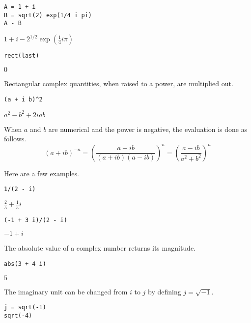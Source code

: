 \documentclass[12pt]{article}
\begin{document}
{\color{blue}
\begin{verbatim}
A = 1 + i
B = sqrt(2) exp(1/4 i pi)
A - B
\end{verbatim}
}

$\displaystyle 1+i-2^{1/2}\exp\left(\tfrac{1}{4}i\pi\right)$

{\color{blue}
\begin{verbatim}
rect(last)
\end{verbatim}
}

$\displaystyle 0$

\bigskip

Rectangular complex quantities, when raised to a power, are multiplied out.

{\color{blue}
\begin{verbatim}
(a + i b)^2
\end{verbatim}
}

$\displaystyle a^2-b^2+2iab$

\bigskip

When $a$ and $b$ are numerical and the power is negative, the evaluation is done as follows.
\begin{equation*}
(a+ib)^{-n}
=\left(\frac{a-ib}{(a+ib)(a-ib)}\right)^n=
\left(\frac{a-ib}{a^2+b^2}\right)^n
\end{equation*}

Here are a few examples.

{\color{blue}
\begin{verbatim}
1/(2 - i)
\end{verbatim}
}

$\displaystyle \tfrac{2}{5}+\tfrac{1}{5}i$

{\color{blue}
\begin{verbatim}
(-1 + 3 i)/(2 - i)
\end{verbatim}
}

$\displaystyle -1+i$

\bigskip

The absolute value of a complex number returns its magnitude.

{\color{blue}
\begin{verbatim}
abs(3 + 4 i)
\end{verbatim}
}

$\displaystyle 5$

\bigskip

The imaginary unit can be changed from $i$ to $j$
by defining $j=\sqrt{-1}$.

{\color{blue}
\begin{verbatim}
j = sqrt(-1)
sqrt(-4)
\end{verbatim}
}
\end{document}
